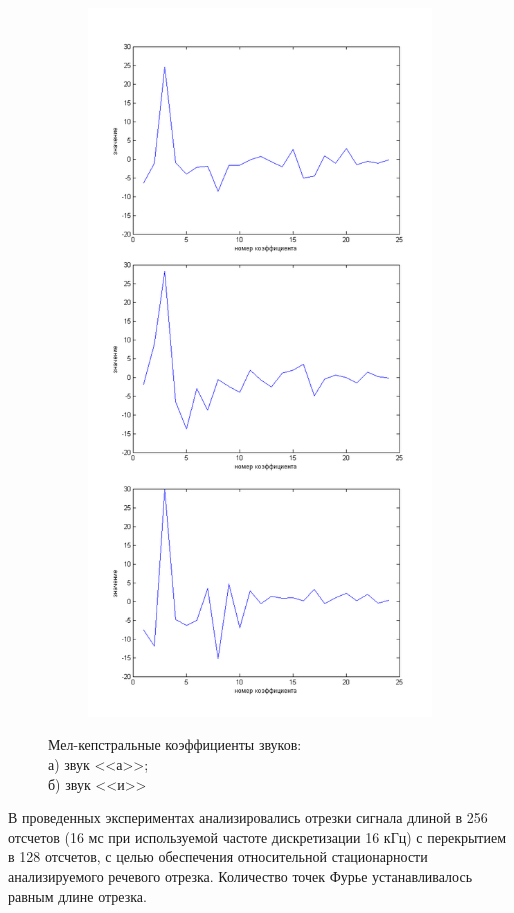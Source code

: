 \documentclass[a4paper,14pt,russian,utf8,nocolumnsxix,nocolumnxxxi,nocolumnxxxii]{eskdtext}
\begin{document}
\begin{figure}[!ht]
\begin{subfigure}{0.49\textwidth}
	\caption{}
	\label{a_mfcc}
	\end{subfigure}
	\begin{subfigure}{0.49\textwidth}
	\centering
	\includegraphics[width=.99\textwidth]{i_mfcc.png}
	\caption{}	
	\label{i_mfcc}
	\end{subfigure}
	\caption{Мел-кепстральные коэффициенты звуков: \\ а) звук <<а>>; \\ б) звук <<и>>}
	\label{sounds_mfcc}
\end{figure}
В проведенных экспериментах анализировались отрезки сигнала длиной в 256 отсчетов (16 мс при используемой частоте дискретизации 16 кГц) с перекрытием в 128 отсчетов, с целью обеспечения относительной стационарности анализируемого речевого отрезка. Количество точек Фурье устанавливалось равным длине отрезка.
\end{document}
